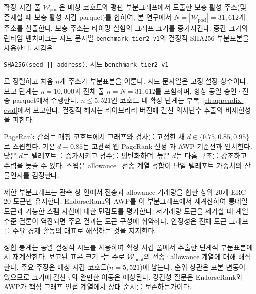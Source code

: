 
확장 지갑 풀 $\mathcal{W}_{\mathrm{pool}}$은 매칭 코호트와 평판 부분그래프에서 도출한 보충 활성 주소(및 존재할 때 보충 활성 지갑 parquet)를 합하여, 본 연구에서 $N=|\mathcal{W}_{\mathrm{pool}}|=31{,}612$개 주소를 산출한다. 보충 주소는 타이밍 실험의 그래프 크기를 증가시킨다. 중간 크기의 런타임 벤치마크는 시드 문자열 \texttt{benchmark-tier2-v1}의 결정적 SHA256 부분표본을 사용한다. 지갑은
\begin{center}
\texttt{SHA256(seed || address)}, 시드 \texttt{benchmark-tier2-v1}
\end{center}
로 정렬하고 처음 $n$개 주소가 부분표본을 이룬다. 시드 문자열은 고정 설정 상수이다. 보고 단계는 $n=10{,}000$과 전체 풀 $n=N=31{,}612$를 포함하며, 항상 동일 승인·전송 parquet에서 수행한다. $n\le 5{,}521$인 코호트 내 확장 단계는 부록~\ref{ch:appendix-eval}에서 보고한다. 결정적 해시는 라이브러리 버전에 걸친 의사난수 추출의 비재현성을 피한다.


PageRank 감쇠는 매칭 코호트에서 그래프와 검사를 고정한 채 $d\in\{0.75,0.85,0.95\}$로 스윕한다. 기본 $d=0.85$는 고전적 웹 PageRank 설정 과 AWP 기준선과 일치한다. 낮은 $d$는 텔레포트를 증가시키고 점수를 평탄화하며, 높은 $d$는 다홉 구조를 강조하고 수렴을 늦출 수 있다. 스윕은 allowance·전송 계열 정합이 단일 텔레포트 가중치의 산물인지를 검정한다.


제한 부분그래프는 관측 창 안에서 전송과 allowance 거래량을 합한 상위 $20$개 ERC-20 토큰만 유지한다. EndorseRank와 AWP를 이 부분그래프에서 재계산하여 롱테일 토큰과 가능한 스팸 자산에 대한 민감도를 평가한다. 저거래량 토큰을 제거할 때 계열 수준 결론이 역전되면 주요 결과는 토큰 구성에 취약하다. 안정성은 전체 토큰 그래프를 주요 경제 활동의 대표로 해석하는 것을 지지한다.


정합 통계는 동일 결정적 시드를 사용하여 확장 지갑 풀에서 추출한 단계적 부분표본에서 재계산한다. 보고된 표본 크기 $\tau$는 주로 $\mathcal{W}_{\mathrm{pool}}$의 전송·allowance 계열에 대해 해석한다. 주요 주장은 매칭 지갑 코호트($n=5{,}521$)에 남는다. 순위 상관은 표본 변동이 있으므로 크기에 걸친 $\tau$의 완만한 이동은 예상된다. 강건성 질문은 EndorseRank와 AWP가 핵심 그래프 인접 계열에서 상대 순서를 보존하는가이다.

